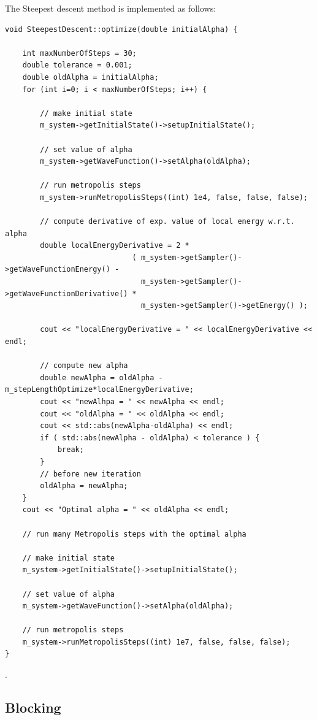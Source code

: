 \documentclass[english, a4paper]{article}
\begin{document}
\noindent The Steepest descent method is implemented as follows:
\belowcaptionskip=-10pt
\begin{lstlisting}[label=steepestdescent,caption=The Steepest Descent method]
 void SteepestDescent::optimize(double initialAlpha) {

    int maxNumberOfSteps = 30;
    double tolerance = 0.001;
    double oldAlpha = initialAlpha;
    for (int i=0; i < maxNumberOfSteps; i++) {

        // make initial state
        m_system->getInitialState()->setupInitialState();

        // set value of alpha
        m_system->getWaveFunction()->setAlpha(oldAlpha);

        // run metropolis steps
        m_system->runMetropolisSteps((int) 1e4, false, false, false);

        // compute derivative of exp. value of local energy w.r.t. alpha
        double localEnergyDerivative = 2 * 
                             ( m_system->getSampler()->getWaveFunctionEnergy() -
                               m_system->getSampler()->getWaveFunctionDerivative() *
                               m_system->getSampler()->getEnergy() );

        cout << "localEnergyDerivative = " << localEnergyDerivative << endl;

        // compute new alpha
        double newAlpha = oldAlpha - m_stepLengthOptimize*localEnergyDerivative;
        cout << "newAlhpa = " << newAlpha << endl;
        cout << "oldAlpha = " << oldAlpha << endl;
        cout << std::abs(newAlpha-oldAlpha) << endl;
        if ( std::abs(newAlpha - oldAlpha) < tolerance ) {
            break;
        }
        // before new iteration
        oldAlpha = newAlpha;
    }
    cout << "Optimal alpha = " << oldAlpha << endl;

    // run many Metropolis steps with the optimal alpha

    // make initial state
    m_system->getInitialState()->setupInitialState();

    // set value of alpha
    m_system->getWaveFunction()->setAlpha(oldAlpha);

    // run metropolis steps
    m_system->runMetropolisSteps((int) 1e7, false, false, false);
}
\end{lstlisting}
.





\subsection{Blocking}
\end{document}
